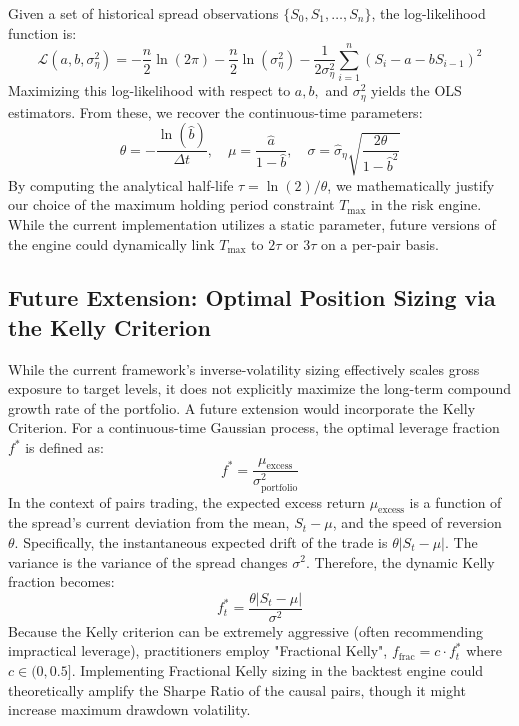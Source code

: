 \documentclass[12pt,a4paper]{article}
\begin{document}
Given a set of historical spread observations $\{S_0, S_1, \dots, S_n\}$, the log-likelihood function is:
\begin{equation}
    \mathcal{L}(a, b, \sigma_\eta^2) = -\frac{n}{2} \ln(2\pi) - \frac{n}{2} \ln(\sigma_\eta^2) - \frac{1}{2\sigma_\eta^2} \sum_{i=1}^n (S_i - a - b S_{i-1})^2
\end{equation}
Maximizing this log-likelihood with respect to $a, b,$ and $\sigma_\eta^2$ yields the OLS estimators. From these, we recover the continuous-time parameters:
\begin{equation}
    \theta = -\frac{\ln(\hat{b})}{\Delta t}, \quad \mu = \frac{\hat{a}}{1 - \hat{b}}, \quad \sigma = \hat{\sigma}_\eta \sqrt{\frac{2\theta}{1 - \hat{b}^2}}
\end{equation}
By computing the analytical half-life $\tau = \ln(2)/\theta$, we mathematically justify our choice of the maximum holding period constraint $T_{\text{max}}$ in the risk engine. While the current implementation utilizes a static parameter, future versions of the engine could dynamically link $T_{\text{max}}$ to $2\tau$ or $3\tau$ on a per-pair basis.

\subsection{Future Extension: Optimal Position Sizing via the Kelly Criterion}
While the current framework's inverse-volatility sizing effectively scales gross exposure to target levels, it does not explicitly maximize the long-term compound growth rate of the portfolio. A future extension would incorporate the Kelly Criterion. For a continuous-time Gaussian process, the optimal leverage fraction $f^*$ is defined as:
\begin{equation}
    f^* = \frac{\mu_{\text{excess}}}{\sigma_{\text{portfolio}}^2}
\end{equation}
In the context of pairs trading, the expected excess return $\mu_{\text{excess}}$ is a function of the spread's current deviation from the mean, $S_t - \mu$, and the speed of reversion $\theta$. Specifically, the instantaneous expected drift of the trade is $\theta |S_t - \mu|$. The variance is the variance of the spread changes $\sigma^2$. Therefore, the dynamic Kelly fraction becomes:
\begin{equation}
    f^*_t = \frac{\theta |S_t - \mu|}{\sigma^2}
\end{equation}
Because the Kelly criterion can be extremely aggressive (often recommending impractical leverage), practitioners employ "Fractional Kelly", $f_{\text{frac}} = c \cdot f^*_t$ where $c \in (0, 0.5]$. Implementing Fractional Kelly sizing in the backtest engine could theoretically amplify the Sharpe Ratio of the causal pairs, though it might increase maximum drawdown volatility.
\end{document}

